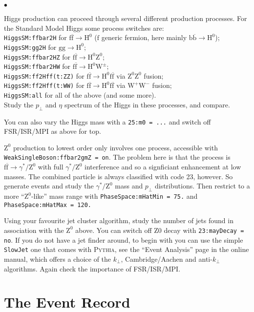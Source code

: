 \documentclass[12pt,a4paper]{article}
\newcommand{\pT}{p_{\perp}}
\renewcommand{\b}{{\mathrm b}}
\newcommand{\f}{{\mathrm f}}
\newcommand{\g}{{\mathrm g}}
\renewcommand{\H}{{\mathrm H}}
\newcommand{\W}{{\mathrm W}}
\newcommand{\Z}{{\mathrm Z}}
\newcommand{\bbar}{\overline{\mathrm b}}
\newcommand{\fbar}{\overline{\mathrm f}}
\newenvironment{Itemize}{\begin{list}{$\bullet$}%
{\setlength{\topsep}{0.4mm}\setlength{\partopsep}{0.4mm}%
\setlength{\itemsep}{0.4mm}\setlength{\parsep}{0.4mm}}}%
{\end{list}}
\begin{document}
\begin{Itemize}
\item Higgs production can proceed through several different 
production processes. For the Standard Model Higgs some process
switches are:\\
\texttt{HiggsSM:ffbar2H} for $\f \fbar \to \H^0$ 
($\f$ generic fermion, here mainly $\b \bbar \to \H^0$); \\ 
\texttt{HiggsSM:gg2H} for $\g \g \to \H^0$; \\ 
\texttt{HiggsSM:ffbar2HZ} for $\f \fbar \to \H^0 \Z^0$; \\ 
\texttt{HiggsSM:ffbar2HW} for $\f \fbar \to \H^0 \W^{\pm}$; \\ 
\texttt{HiggsSM:ff2Hff(t:ZZ)}  for $\f \fbar \to \H^0\f \fbar$
via $\Z^0\Z^0$ fusion; \\ 
\texttt{HiggsSM:ff2Hff(t:WW)}  for $\f \fbar \to \H^0\f \fbar$
via $\W^+\W^-$ fusion; \\ 
\texttt{HiggsSM:all} for all of the above (and some more). \\
Study the $\pT$ and $\eta$ spectrum of the Higgs in these processes,
and compare. 
\item You can also vary the Higgs mass with a \texttt{25:m0 = ...}
and switch off FSR/ISR/MPI as above for top.
\item $\Z^0$ production to lowest order only involves one process,
accessible with \texttt{WeakSingleBoson:ffbar2gmZ = on}. The problem
here is that the process is $\f \fbar \to \gamma^*/\Z^0$ with full
$\gamma^*/\Z^0$ interference and so a signficiant enhancement at low
masses. The combined particle is always classified with code 23,
however. So generate events and study the $\gamma^*/\Z^0$ mass and
$\pT$ distributions. Then restrict to a more ``$\Z^0$-like''  
mass range with \texttt{PhaseSpace:mHatMin = 75.} and 
\texttt{PhaseSpace:mHatMax = 120.}
\item Using your favourite jet cluster algorithm, study the number 
of jets found in association with the $\Z^0$ above. You can switch 
off Z0 decay with \texttt{23:mayDecay = no}. If you do not have a jet 
finder around, to begin with you can use the simple \texttt{SlowJet} 
one that comes with \textsc{Pythia}, see the ``Event Analysis'' page 
in the online manual, which offers a choice of the $k_{\perp}$, 
Cambridge/Aachen and anti-$k_{\perp}$ algorithms. Again check the 
importance of FSR/ISR/MPI. 
\end{Itemize}

\appendix
\section{The Event Record}
\end{document}
